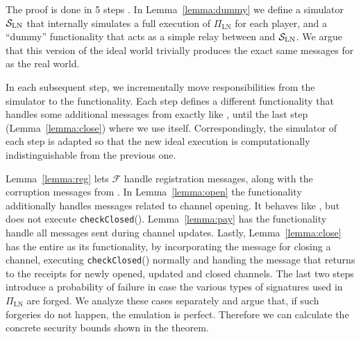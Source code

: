   \begin{proofsketch}
    The proof is done in 5 steps . In
    Lemma~\ref{lemma:dummy} we define a simulator $\mathcal{S}_{\mathrm{LN}}$
    that internally simulates a full execution of $\Pi_{\mathrm{LN}}$ for each
    player, and a ``dummy'' functionality that acts as a simple relay between
    \environment{} and $\mathcal{S}_{\mathrm{LN}}$. We argue that this version of
    the ideal world trivially produces the exact same messages for
    \environment{} as the real world.

    In each subsequent step, we incrementally move responsibilities from the
    simulator to the functionality. Each step defines a
    different functionality that handles some additional messages from
    \environment{} exactly like \fpaynet, until the last step
    (Lemma~\ref{lemma:close}) where we use \fpaynet{} itself. Correspondingly,
    the simulator of each step is adapted so that the new ideal execution is
    computationally indistinguishable from the previous one. 

    Lemma~\ref{lemma:reg} lets $\mathcal{F}$ handle registration messages,
    along with the corruption messages from \simulator. In Lemma~\ref{lemma:open}
    the functionality additionally handles messages related to channel opening. It
    behaves like \fpaynet, but does not execute \texttt{checkClosed}().
    Lemma~\ref{lemma:pay} has the functionality handle all messages sent during
    channel updates. Lastly, Lemma~\ref{lemma:close} has the entire \fpaynet{} as
    its functionality, by incorporating the message for closing a channel,
    executing \texttt{checkClosed}() normally and handing the message that returns
    to \environment{} the receipts for newly opened, updated and closed
    channels. The last two steps introduce a probability of failure in case
    the various types of signatures used in  $\Pi_{\mathrm{LN}}$ are forged. We analyze these cases separately and argue that, if
    such forgeries do not happen, the emulation is perfect. Therefore we can
    calculate the concrete security bounds shown in the theorem.
  \end{proofsketch}
